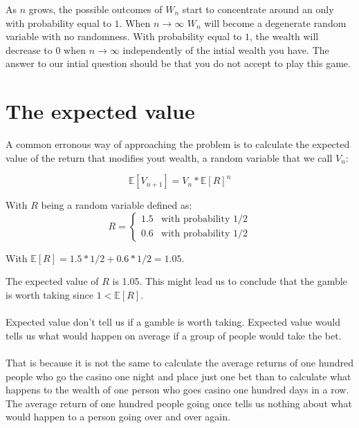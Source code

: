 \documentclass[12pt]{article}
\begin{document}
As $n$ grows, the possible outcomes of $W_n$ start to concentrate around an only with probability equal to $1$. When $n \rightarrow \infty$ $W_n$ will become a degenerate random variable with no randomness. With probability equal to $1$, the wealth will decrease to 0 when $n\to\infty$ independently of the intial wealth you have. The answer to our intial question should be that you do not accept to play this game.

\section{The expected value}
A common erronous way of approaching the problem is to calculate the expected value of the return that modifies yout wealth, a random variable that we call $V_n$:

\begin{equation*}
  \mathbb{E}[V_{n+1}] = V_{n} * \mathbb{E}[R]^n
\end{equation*}

With $R$ being a random variable defined as:
\begin{equation*}
R = \left\{
	\begin{array}{ll}
		1.5 & \mbox{with probability 1/2} \\
		0.6 & \mbox{with probability 1/2}
	\end{array}
\right.
\end{equation*}

With $\mathbb{E}[R] = 1.5 * 1/2 + 0.6 * 1/2 = 1.05$.

The expected value of $R$ is 1.05. This might lead us to conclude that the gamble is worth taking since $1 < \mathbb{E}[R]$.
\\\\
Expected value don't tell us if a gamble is worth taking. Expected value would tells us what would happen on average if a group of people would take the bet.
\\\\
That is because it is not the same to calculate the average returns of one hundred people who go the casino one night and place just one bet than to calculate what happens to the wealth of one person who goes casino one hundred days in a row. The average return of one hundred people going once tells us nothing about what would happen to a person going over and over again. 
\end{document}
